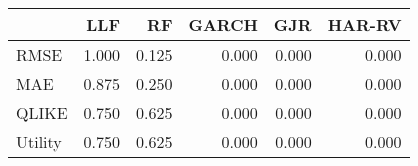 \begin{tabular}{lrrrrr}
\toprule
 & LLF & RF & GARCH & GJR & HAR-RV \\
\midrule
RMSE & 1.000 & 0.125 & 0.000 & 0.000 & 0.000 \\
MAE & 0.875 & 0.250 & 0.000 & 0.000 & 0.000 \\
QLIKE & 0.750 & 0.625 & 0.000 & 0.000 & 0.000 \\
Utility & 0.750 & 0.625 & 0.000 & 0.000 & 0.000 \\
\bottomrule
\end{tabular}
